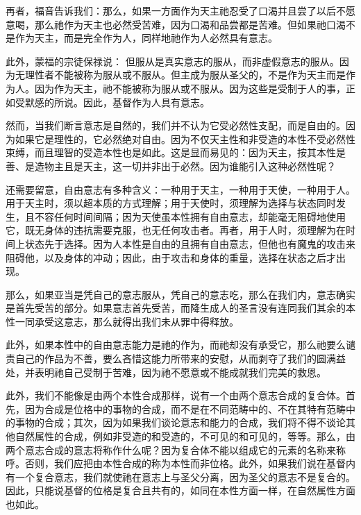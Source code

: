 再者，福音告诉我们：那么，如果一方面作为天主祂忍受了口渴并且尝了以后不愿意喝，那么祂作为天主也必然受苦难，因为口渴和品尝都是苦难。但如果祂口渴不是作为天主，而是完全作为人，同样地祂作为人必然具有意志。\par

此外，蒙福的宗徒保禄说： 但服从是真实意志的服从，而非虚假意志的服从。因为无理性者不能被称为服从或不服从。但主成为服从圣父的，不是作为天主而是作为人。因为作为天主，祂不能被称为服从或不服从。因为这些是受制于人的事，正如受默感的所说。因此，基督作为人具有意志。\par

然而，当我们断言意志是自然的，我们并不认为它受必然性支配，而是自由的。因为如果它是理性的，它必然绝对自由。因为不仅天主性和非受造的本性不受必然性束缚，而且理智的受造本性也是如此。这是显而易见的：因为天主，按其本性是善、是造物主且是天主，这一切并非出于必然。因为谁能引入这种必然性呢？\par

还需要留意，自由意志有多种含义：一种用于天主，一种用于天使，一种用于人。用于天主时，须以超本质的方式理解；用于天使时，须理解为选择与状态同时发生，且不容任何时间间隔；因为天使虽本性拥有自由意志，却能毫无阻碍地使用它，既无身体的违抗需要克服，也无任何攻击者。再者，用于人时，须理解为在时间上状态先于选择。因为人本性是自由的且拥有自由意志，但他也有魔鬼的攻击来阻碍他，以及身体的冲动；因此，由于攻击和身体的重量，选择在状态之后才出现。\par

那么，如果亚当是凭自己的意志服从，凭自己的意志吃，那么在我们内，意志确实是首先受苦的部分。如果意志首先受苦，而降生成人的圣言没有连同我们其余的本性一同承受这意志，那么就得出我们未从罪中得释放。\par

此外，如果本性中的自由意志能力是祂的作为，而祂却没有承受它，那么祂要么谴责自己的作品为不善，要么吝惜这能力所带来的安慰，从而剥夺了我们的圆满益处，并表明祂自己受制于苦难，因为祂不愿意或不能成就我们完美的救恩。\par

此外，我们不能像是由两个本性合成那样，说有一个由两个意志合成的复合体。首先，因为合成是位格中的事物的合成，而不是在不同范畴中的、不在其特有范畴中的事物的合成；其次，因为如果我们谈论意志和能力的合成，我们将不得不谈论其他自然属性的合成，例如非受造的和受造的，不可见的和可见的，等等。那么，由两个意志合成的意志将称作什么呢？因为复合体不能以组成它的元素的名称来称呼。否则，我们应把由本性合成的称为本性而非位格。此外，如果我们说在基督内有一个复合意志，我们就使祂在意志上与圣父分离，因为圣父的意志不是复合的。因此，只能说基督的位格是复合且共有的，如同在本性方面一样，在自然属性方面也如此。\par

